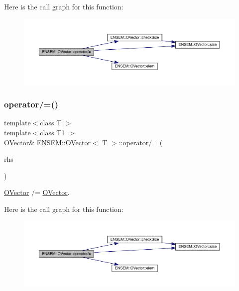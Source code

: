 Here is the call graph for this function\+:
\nopagebreak
\begin{figure}[H]
\begin{center}
\leavevmode
\includegraphics[width=350pt]{d0/d8d/classENSEM_1_1OVector_a61d1911393adf46629dd493ef09c1022_cgraph}
\end{center}
\end{figure}
\mbox{\label{classENSEM_1_1OVector_a61d1911393adf46629dd493ef09c1022}} 
\subsubsection{\texorpdfstring{operator/=()}{operator/=()}\hspace{0.1cm}{\footnotesize\ttfamily [5/6]}}
{\footnotesize\ttfamily template$<$class T $>$ \\
template$<$class T1 $>$ \\
\mbox{\hyperlink{classENSEM_1_1OVector}{O\+Vector}}\& \mbox{\hyperlink{classENSEM_1_1OVector}{E\+N\+S\+E\+M\+::\+O\+Vector}}$<$ T $>$\+::operator/= (\begin{DoxyParamCaption}\item[{const \mbox{\hyperlink{classENSEM_1_1OVector}{O\+Vector}}$<$ T1 $>$ \&}]{rhs }\end{DoxyParamCaption})\hspace{0.3cm}{\ttfamily [inline]}}



\mbox{\hyperlink{classENSEM_1_1OVector}{O\+Vector}} /= \mbox{\hyperlink{classENSEM_1_1OVector}{O\+Vector}}. 

Here is the call graph for this function\+:
\nopagebreak
\begin{figure}[H]
\begin{center}
\leavevmode
\includegraphics[width=350pt]{d0/d8d/classENSEM_1_1OVector_a61d1911393adf46629dd493ef09c1022_cgraph}
\end{center}
\end{figure}
\mbox{\label{classENSEM_1_1OVector_a61d1911393adf46629dd493ef09c1022}} 
